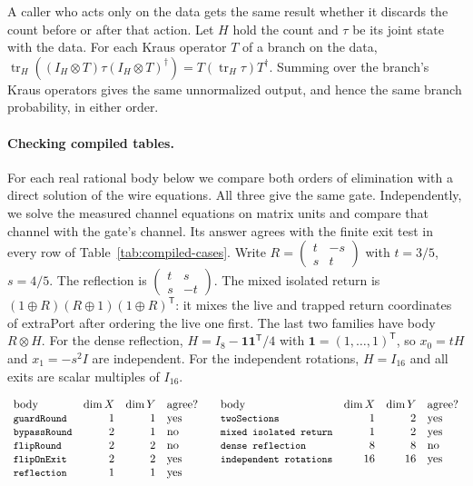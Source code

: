 \documentclass[acmsmall,screen,review,anonymous,nonacm]{acmart}
\newcommand{\storyinlineface}{\small\ttfamily}
\newcommand{\code}[1]{\textnormal{\storyinlineface #1}}
\newcommand{\tr}{\operatorname{tr}}
\numberwithin{equation}{section}
\begin{document}
A caller who acts only on the data gets the same result whether it discards
the count before or after that action. Let $H$ hold the count and $\tau$ be its
joint state with the data. For each Kraus operator $T$ of a branch on the data,
$\tr_H((I_H\otimes T)\tau(I_H\otimes T)^\dagger)=T(\tr_H\tau)T^\dagger$.
Summing over the branch's Kraus operators gives the same unnormalized output,
and hence the same branch probability, in either order.

\paragraph{Checking compiled tables.}
For each real rational body below we compare both orders of elimination with a direct
solution of the wire equations. All three give the same gate. Independently, we solve the
measured channel equations on matrix units and compare that channel with the gate's
channel. Its answer agrees with the finite exit test in every row of
Table~\ref{tab:compiled-cases}. Write $R=\left(\begin{smallmatrix}t&-s\\s&t\end{smallmatrix}\right)$
with $t=3/5$, $s=4/5$. The reflection is $\left(\begin{smallmatrix}t&s\\s&-t\end{smallmatrix}\right)$.
The mixed isolated return is $(1\oplus R)(R\oplus1)(1\oplus R)^\mathsf T$:
it mixes the live and trapped return coordinates of \code{extraPort} after ordering the live one first.
The last two families have body $R\otimes H$. For the dense reflection,
$H=I_8-\mathbf1\mathbf1^\mathsf T/4$ with $\mathbf1=(1,\ldots,1)^\mathsf T$,
so $x_0=tH$ and $x_1=-s^2I$ are independent. For the independent rotations,
$H=I_{16}$ and all exits are scalar multiples of $I_{16}$.
\par\smallskip\noindent\begin{minipage}{\linewidth}\centering
\captionsetup{type=table,hypcap=false}\caption{Agreement on rational clause tables. Each dimension counts basis values.}\label{tab:compiled-cases}
$\begin{array}{lrrl@{\qquad}lrrl}
\text{body}&\dim X&\dim Y&\text{agree?}&\text{body}&\dim X&\dim Y&\text{agree?}\\
\code{guardRound}&1&1&\text{yes}&\code{twoSections}&1&2&\text{yes}\\
\code{bypassRound}&2&1&\text{no}&\code{mixed isolated return}&1&2&\text{yes}\\
\code{flipRound}&2&2&\text{no}&\code{dense reflection}&8&8&\text{no}\\
\code{flipOnExit}&2&2&\text{yes}&\code{independent rotations}&16&16&\text{yes}\\
\code{reflection}&1&1&\text{yes}
\end{array}$
\end{minipage}\par
\end{document}
